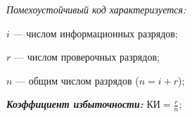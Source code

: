 \bigskip\noindent
\emph{Помехоустойчивый код характеризуется:}
\begin{description}[style=standard]
    \item $i$ --- числом информационных разрядов;
    \item $r$ --- числом проверочных разрядов;
    \item $n$ --- общим числом разрядов ($n = i + r$);
\end{description}

\noindent\emph{\textbf{Коэффициент избыточности:}} $\text{КИ}=\displaystyle\frac{r}{n}$;
